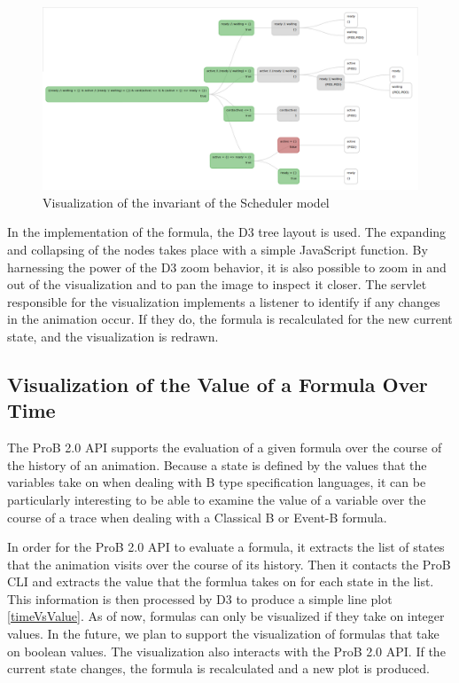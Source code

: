\begin{figure}[h!]
\centering
\includegraphics[width=15cm]{bilder/invariant.png}
\caption{Visualization of the invariant of the Scheduler model}
\label{predicate}
\end{figure}

In the implementation of the formula, the D3 tree layout is used. The expanding and collapsing of the nodes takes place with a simple JavaScript function. By harnessing the power of the D3 zoom behavior, it is also possible to zoom in and out of the visualization and to pan the image to inspect it closer. The servlet responsible for the visualization implements a listener to identify if any changes in the animation occur. If they do, the formula is recalculated for the new current state, and the visualization is redrawn.

\subsection{Visualization of the Value of a Formula Over Time}

The ProB 2.0 API supports the evaluation of a given formula over the course of the history of an animation.
Because a state is defined by the values that the variables take on when dealing with B type specification languages, it can be particularly interesting to be able to examine the value of a variable over the course of a trace when dealing with a Classical B or Event-B formula. 

In order for the ProB 2.0 API to evaluate a formula, it extracts the list of states that the animation visits over the course of its history. Then it contacts the ProB CLI and extracts the value that the formlua takes on for each state in the list. This information is then processed by D3 to produce a simple line plot \ref{timeVsValue}. As of now, formulas can only be visualized if they take on integer values. In the future, we plan to support the visualization of formulas that take on boolean values. The visualization also interacts with the ProB 2.0 API. If the current state changes, the formula is recalculated and a new plot is produced.

